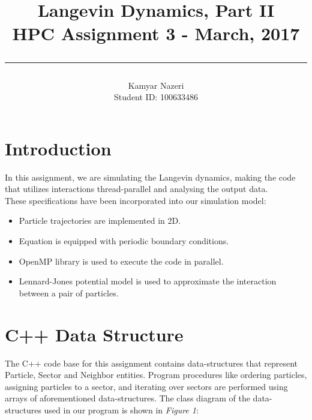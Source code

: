 \documentclass[a4paper,11pt]{article}
\begin{document}
\title{
	\Huge \textbf {Langevin Dynamics, Part II}
    \\ [0.2cm]
	\LARGE HPC Assignment 3 - March, 2017
    \\ [0.5cm]
    \hrule
}

\date{}

\author{
		\Large Kamyar Nazeri \\
		\large Student ID: 100633486 }

\maketitle
\newpage

\section*{Introduction}
In this assignment, we are simulating the Langevin dynamics, making the code that utilizes interactions thread-parallel and analysing the output data. \\
These specifications have been incorporated into our simulation model:
\begin{itemize}
  \item Particle trajectories are implemented in 2D.
  \item Equation is equipped with periodic boundary conditions.
  \item OpenMP \cite{omp} library is used to execute the code in parallel.
  \item Lennard-Jones potential model \cite{lj} is used to approximate the interaction between a pair of particles.
\end{itemize}

\section*{C++ Data Structure}
The C++ code base for this assignment contains data-structures that represent Particle, Sector and Neighbor entities. Program procedures like ordering particles, assigning particles to a sector, and iterating over sectors are performed using arrays of aforementioned data-structures. The class diagram of the data-structures used in our program is shown in \emph{Figure 1}:
\end{document}
